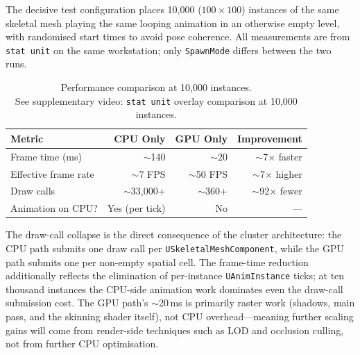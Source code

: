 \documentclass[11pt, a4paper]{article}
\begin{document}
The decisive test configuration places 10{,}000 ($100 \times 100$) instances of the same skeletal mesh playing the same looping animation in an otherwise empty level, with randomised start times to avoid pose coherence. All measurements are from \texttt{stat unit} on the same workstation; only \texttt{SpawnMode} differs between the two runs.

\begin{table}[h]
\centering
\begin{tabular}{lrrr}
\toprule
\textbf{Metric} & \textbf{CPU Only} & \textbf{GPU Only} & \textbf{Improvement} \\
\midrule
Frame time (ms)          & $\sim$140              & $\sim$20            & $\sim$7$\times$ faster  \\
Effective frame rate     & $\sim$7 FPS            & $\sim$50 FPS        & $\sim$7$\times$ higher  \\
Draw calls               & $\sim$33{,}000+        & $\sim$360+          & $\sim$92$\times$ fewer  \\
Animation on CPU?        & Yes (per tick)         & No                  & ---                     \\
\bottomrule
\end{tabular}
\caption{Performance comparison at 10{,}000 instances. \\
\footnotesize See supplementary video: \texttt{stat unit} overlay comparison at 10{,}000 instances.}
\label{tab:perf}
\end{table}


The draw-call collapse is the direct consequence of the cluster architecture: the CPU path submits one draw call per \texttt{USkeletalMeshComponent}, while the GPU path submits one per non-empty spatial cell. The frame-time reduction additionally reflects the elimination of per-instance \texttt{UAnimInstance} ticks; at ten thousand instances the CPU-side animation work dominates even the draw-call submission cost. The GPU path's $\sim$20\,ms is primarily raster work (shadows, main pass, and the skinning shader itself), not CPU overhead---meaning further scaling gains will come from render-side techniques such as LOD and occlusion culling, not from further CPU optimisation.
\end{document}

